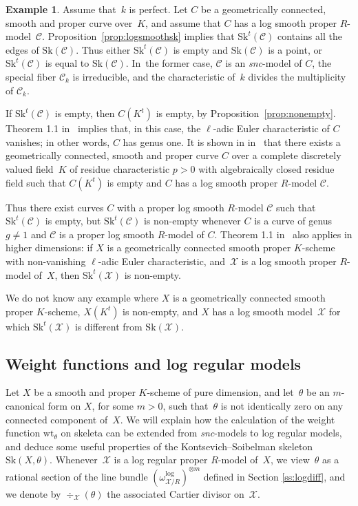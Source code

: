 \documentclass[JEP,XML,SOM,Unicode,NoFloatCountersInSection]{cedram}
\theoremstyle{definition}
\newtheorem{example}[equation]{Example}
\numberwithin{equation}{subsection}
\newcommand{\cX}{\ensuremath{\mathscr{X}}}
\newcommand{\cC}{\ensuremath{\mathscr{C}}}
\newcommand{\snc}{\textit{snc}}
\newcommand{\Sk}{\mathrm{Sk}}
\newcommand{\wt}{\mathrm{wt}}
\let\form\theta
\begin{document}
\begin{example}
Assume that~$k$ is perfect. Let $C$ be a geometrically connected, smooth and proper curve over~$K$, and assume that $C$ has a log smooth proper $R$\nobreakdash-model~$\cC$. Proposition~\ref{prop:logsmoothsk} implies that
$\Sk^t(\cC)$ contains all the edges of $\Sk(\cC)$.
Thus either $\Sk^t(\cC)$ is empty and $\Sk(\cC)$ is a point, or $\Sk^t(\cC)$ is equal to $\Sk(\cC)$.
In~the former case, $\cC$ is an \snc-model of $C$, the special fiber $\cC_k$ is irreducible, and the characteristic of~$k$ divides the multiplicity of $\cC_k$.

If $\Sk^t(\cC)$ is empty, then $C(K^t)$ is empty, by Proposition~\ref{prop:nonempty}.
Theorem 1.1 in~\cite{mitsui-smeets} implies that, in this case, the $\ell$-adic Euler characteristic of $C$ vanishes; in other words, $C$ has genus one.
It is shown in in~\cite{mitsui-smeets} that there exists a geometrically connected, smooth and proper curve $C$ over a complete discretely valued field~$K$ of residue characteristic $p>0$ with algebraically closed residue field such that $C(K^t)$ is
empty and $C$ has a log smooth proper $R$\nobreakdash-model $\cC$.

Thus there exist curves $C$ with a proper log smooth $R$\nobreakdash-model $\cC$ such that $\Sk^t(\cC)$ is empty, but $\Sk^t(\cC)$ is non-empty whenever $C$ is a curve of genus $g\neq 1$ and $\cC$ is a proper log smooth $R$\nobreakdash-model of $C$.
Theorem 1.1 in~\cite{mitsui-smeets} also applies in higher dimensions:
if $X$ is a geometrically connected smooth proper $K$\nobreakdash-scheme with non-vanishing $\ell$-adic Euler characteristic, and~$\cX$ is a log smooth proper $R$\nobreakdash-model of~$X$, then $\Sk^t(\cX)$ is non-empty.

We do not know any example where $X$ is a geometrically connected smooth proper $K$\nobreakdash-scheme,
$X(K^t)$ is non-empty, and $X$ has a log smooth model~$\cX$ for which $\Sk^t(\cX)$ is different from $\Sk(\cX)$.
\end{example}

\subsection{Weight functions and log regular models}
Let $X$ be a smooth and proper $K$\nobreakdash-scheme of pure dimension, and let~$\form$ be an $m$-canonical form on $X$, for some $m>0$, such that~$\form$ is not identically zero on any connected component of~$X$. We will explain how the calculation of the weight function $\wt_{\form}$ on skeleta can be extended from \snc-models to log regular models, and deduce some useful properties of the Kontsevich--Soibelman skeleton $\Sk(X,\form)$. Whenever~$\cX$ is a log regular proper $R$\nobreakdash-model of~$X$, we view~$\form$ as a rational section of the line bundle $(\omega^{\log}_{\cX/R})^{\otimes m}$ defined in Section \ref{ss:logdiff}, and we denote by $\div_{\cX}(\form)$ the associated Cartier divisor on~$\cX$.
\end{document}
